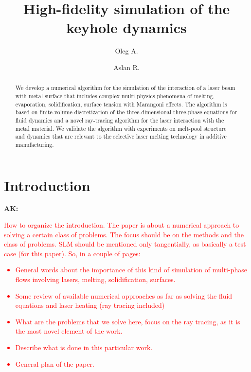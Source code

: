 \documentclass[final]{elsarticle} %
\newcommand{\alert}[1]{\textcolor{red}{#1}} %
\newcommand{\ak}[1] {\textbf{AK:} \textcolor{red}{#1}}
\begin{document}
\begin{frontmatter}

\title{High-fidelity simulation of the keyhole dynamics}
\author[1]{Oleg A. }
\author[1]{Aslan R. }
\address[1] {Skolkovo Institute of Science and Technology,
    Bolshoy Boulevard 30, bld. 1, Moscow, 121205, Russia}

\begin{abstract}
We develop a numerical algorithm for the simulation of the interaction of a laser beam with metal surface that includes complex multi-physics phenomena of melting, evaporation, solidification, surface tension with Marangoni effects. The algorithm is based on finite-volume discretization of the three-dimensional three-phase equations for fluid dynamics and a novel ray-tracing algorithm for the laser interaction with the metal material. We validate the algorithm with experiments on melt-pool structure and dynamics that are relevant to the selective laser melting technology in additive manufacturing.
\end{abstract}

\end{frontmatter}

\tableofcontents

\section{Introduction}
\ak{How to organize the introduction. The paper is about a numerical approach to solving a certain class of problems. The focus should be on the methods and the class of problems. SLM should be mentioned only tangentially, as basically a test case (for this paper).
So, in a couple of pages:
\begin{itemize}
    \item General words about the importance of this kind of simulation of multi-phase flows involving lasers, melting, solidification, surfaces.
    \item Some review of available numerical approaches as far as solving the fluid equations and laser heating (ray tracing included)
    \item What are the problems that we solve here, focus on the ray tracing, as it is the most novel element of the work.
    \item Describe what is done in this particular work.
    \item General plan of the paper.
\end{itemize}
}
\end{document}
